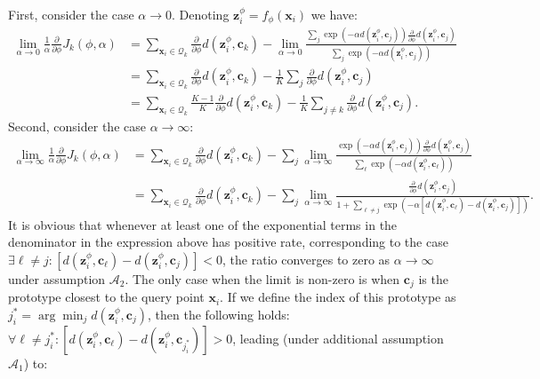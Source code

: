 \documentclass{article}
\renewcommand{\vec}[1]{\mathbf{#1}}
\newcommand{\query}[1]{\mathcal{Q}_{#1}}
\newcommand{\metric}{d}
\begin{document}
First, consider the case $\alpha \to 0$. Denoting $\vec{z}_i^{\phi} = f_{\phi}(\vec{x}_i)$ we have:
\begin{align} %
    \lim_{\alpha \to 0} \frac{1}{\alpha}\frac{\partial}{\partial\phi}J_k(\phi,\alpha) &= \sum_{\vec{x}_i \in \query{k}} \frac{\partial}{\partial\phi} \metric(\vec{z}_i^{\phi}, \vec{c}_k)  - \lim_{\alpha \to 0} \frac{\sum_{j} \exp(-\alpha \metric(\vec{z}_i^{\phi}, \vec{c}_j)) \frac{\partial}{\partial\phi} \metric(\vec{z}_i^{\phi}, \vec{c}_j)}{\sum_{j} \exp(-\alpha \metric(\vec{z}_i^{\phi}, \vec{c}_j))} \nonumber \\
    &= \sum_{\vec{x}_i \in \query{k}} \frac{\partial}{\partial\phi} \metric(\vec{z}_i^{\phi}, \vec{c}_k)  - \frac{1}{K} \sum_{j} \frac{\partial}{\partial\phi} \metric(\vec{z}_i^{\phi}, \vec{c}_j) \nonumber \\
    &= \sum_{\vec{x}_i \in \query{k}} \frac{K-1}{K} \frac{\partial}{\partial\phi} \metric(\vec{z}_i^{\phi}, \vec{c}_k)  - \frac{1}{K} \sum_{j \neq k} \frac{\partial}{\partial\phi} \metric(\vec{z}_i^{\phi}, \vec{c}_j). \nonumber
\end{align}
Second, consider the case  $\alpha \to \infty$:
\begin{align} %
    \lim_{\alpha \to \infty} \frac{1}{\alpha}\frac{\partial}{\partial\phi}J_k(\phi,\alpha) &= \sum_{\vec{x}_i \in \query{k}} \frac{\partial}{\partial\phi} \metric(\vec{z}_i^{\phi}, \vec{c}_k)  - \sum_{j} \lim_{\alpha \to \infty} \frac{\exp(-\alpha \metric(\vec{z}_i^{\phi}, \vec{c}_j)) \frac{\partial}{\partial\phi} \metric(\vec{z}_i^{\phi}, \vec{c}_j)}{\sum_{\ell} \exp(-\alpha \metric(\vec{z}_i^{\phi}, \vec{c}_\ell))} \nonumber \\
    &= \sum_{\vec{x}_i \in \query{k}} \frac{\partial}{\partial\phi} \metric(\vec{z}_i^{\phi}, \vec{c}_k)  - \sum_{j} \lim_{\alpha \to \infty} \frac{\frac{\partial}{\partial\phi} \metric(\vec{z}_i^{\phi}, \vec{c}_j)}{1 + \sum_{\ell \neq j}  \exp(-\alpha [\metric(\vec{z}_i^{\phi}, \vec{c}_\ell) - \metric(\vec{z}_i^{\phi}, \vec{c}_j)])}. \nonumber
\end{align}
It is obvious that whenever at least one of the exponential terms in the denominator in the expression above has positive rate, corresponding to the case $\exists \ell\neq j:  [\metric(\vec{z}_i^{\phi}, \vec{c}_\ell) - \metric(\vec{z}_i^{\phi}, \vec{c}_j)] < 0$, the ratio converges to zero as  $\alpha \to \infty$ under assumption $\mathcal{A}_2$. The only case when the limit is non-zero is when $\vec{c}_j$ is the prototype closest to the query point $\vec{x}_i$. If we define the index of this prototype as $j_{i}^* = \arg\min_j \metric(\vec{z}_i^{\phi}, \vec{c}_j)$, then the following holds: $\forall \ell\neq j_{i}^*:  [\metric(\vec{z}_i^{\phi}, \vec{c}_\ell) - \metric(\vec{z}_i^{\phi}, \vec{c}_{j_{i}^*})] > 0$, leading (under additional assumption $\mathcal{A}_1$) to:
\end{document}
